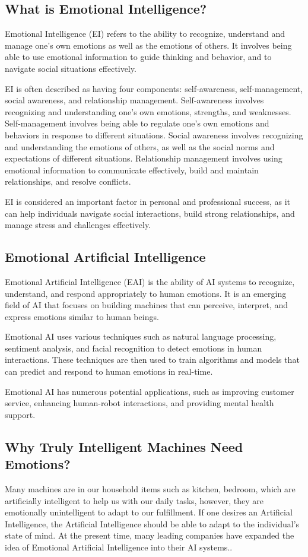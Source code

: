 \subsection{What is Emotional Intelligence?}
Emotional Intelligence (EI) refers to the ability to recognize, understand and manage one's own emotions as well as the emotions of others. It involves being able to use emotional information to guide thinking and behavior, and to navigate social situations effectively\cite{ISSN-2456-2165}.

EI is often described as having four components: self-awareness, self-management, social awareness, and relationship management. Self-awareness involves recognizing and understanding one's own emotions, strengths, and weaknesses. Self-management involves being able to regulate one's own emotions and behaviors in response to different situations. Social awareness involves recognizing and understanding the emotions of others, as well as the social norms and expectations of different situations. Relationship management involves using emotional information to communicate effectively, build and maintain relationships, and resolve conflicts.

EI is considered an important factor in personal and professional success, as it can help individuals navigate social interactions, build strong relationships, and manage stress and challenges effectively.

\subsection{Emotional Artificial Intelligence}
Emotional Artificial Intelligence (EAI) is the ability of AI systems to recognize, understand, and respond appropriately to human emotions. It is an emerging field of AI that focuses on building machines that can perceive, interpret, and express emotions similar to human beings. 

Emotional AI uses various techniques such as natural language processing, sentiment analysis, and facial recognition to detect emotions in human interactions. These techniques are then used to train algorithms and models that can predict and respond to human emotions in real-time.

Emotional AI has numerous potential applications, such as improving customer service, enhancing human-robot interactions, and providing mental health support.

\subsection{Why Truly Intelligent Machines Need Emotions?}
Many machines are in our household items such as kitchen, bedroom, which are artificially intelligent to help us with our daily tasks, however, they are emotionally unintelligent to adapt to our fulfillment. If one desires an Artificial Intelligence, the Artificial Intelligence should be able to adapt to the individual's state of mind. At the present time, many leading companies have expanded the idea of Emotional Artificial Intelligence into their AI systems.\cite{ISSN-2456-2165}.

